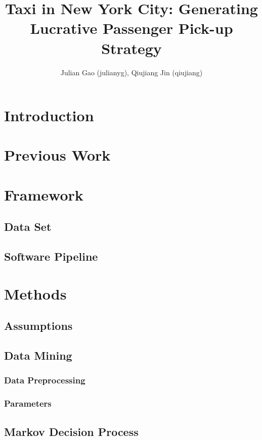 \documentclass[letterpaper, 10 pt, conference]{ieeeconf}
\title{\LARGE \bf Taxi in New York City: Generating Lucrative Passenger Pick-up Strategy}
\author{Julian Gao (julianyg), Qiujiang Jin (qiujiang)}
\begin{document}
\maketitle
\section{Introduction}

\section{Previous Work}

\section{Framework}

\subsection{Data Set}

\subsection{Software Pipeline}

\section{Methods}
\subsection{Assumptions}

\subsection{Data Mining}

\subsubsection{Data Preprocessing}

\subsubsection{Parameters}

\subsection{Markov Decision Process}
\end{document}

